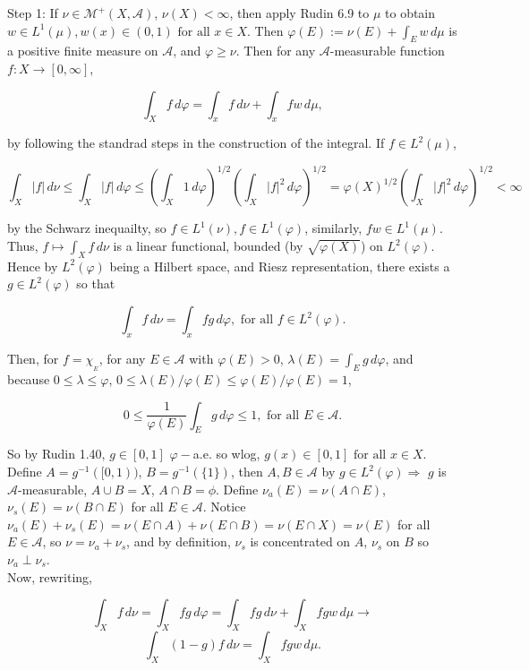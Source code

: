 \documentclass[12pt]{article}
\newcommand{\fall}[0] { \textrm{ for all } }
\newcommand{\rimply}[0] { \Rightarrow }
\newcommand{\rarw}[0] { \rightarrow }
\newcommand{\A}[0] { \mathcal{A} }
\newcommand{\M}[0] { \mathcal{M} }
\begin{document}
\noindent
Step 1: If $\nu \in \M^+(X, \A)$,  $\nu(X) < \infty$, then apply Rudin 6.9 to $\mu$ to obtain $w \in L^1(\mu), w(x) \in (0,1) \fall x \in X$. Then $\varphi(E) := \nu(E) + \int_E w \, d\mu$ is a positive finite measure on $\A$, and $\varphi \ge \nu$. Then for any $\A$-measurable function $f:X \rarw [0, \infty]$,

$$
\int_X f \, d\varphi = \int_x f \, d\nu + \int_x f w \, d\mu,
$$

\noindent
by following the standrad steps in the construction of the integral. If $f \in L^2(\mu)$,


$$
\int_X |f| \, d\nu  \le  \int_X |f| \, d\varphi \le \left( \int_X 1 \, d\varphi \right)^{1/2} \left( \int_X |f|^2 \, d\varphi \right)^{1/2}   = \varphi(X)^{1/2} \left( \int_X |f|^2 \, d\varphi \right)^{1/2} < \infty
$$

\noindent
by the Schwarz inequailty, so $f \in L^1(\nu), f \in L^1(\varphi)$, similarly, $fw \in L^1(\mu)$. Thus, $f \mapsto \int_X f \, d\nu$ is a linear functional, bounded (by $\sqrt{\varphi(X)}$)  on $L^2(\varphi)$. Hence by $L^2(\varphi)$ being a Hilbert space, and Riesz representation, there exists a $g \in L^2(\varphi)$ so that

$$
\int_x f \, d\nu = \int_x fg \, d\varphi, \fall f \in L^2(\varphi).
$$


\noindent
Then, for $f = \chi_{_E}$, for any $E \in \A$ with $\varphi(E) > 0$, $\lambda(E) = \int_E g \, d\varphi$, and because $ 0 \le \lambda \le \varphi$, $ 0 \le \lambda(E) / \varphi(E) \le \varphi(E)  / \varphi(E) = 1$,

$$
0 \le \frac{1}{\varphi(E)} \int_E g \, d\varphi \le 1, \fall E \in \A.
$$

\noindent
So by Rudin 1.40, $g \in [0,1]$ $\varphi-$a.e. so wlog, $g(x) \in [0,1] \fall x \in X$. \\

\noindent
Define $A = g^{-1} ([0,1))$, $B = g^{-1}( \{ 1 \})$, then $A,B \in \A$ by $g \in L^2(\varphi) \rimply$ $g$ is $\A$-measurable, $A \cup B = X$, $A \cap B = \phi$. Define $\nu_a(E) = \nu(A \cap E)$, $\nu_s(E) = \nu(B \cap E)$ for all $E \in \A$. Notice $\nu_a(E) + \nu_s(E) = \nu(E \cap A) + \nu(E \cap B) = \nu(E \cap X) = \nu(E)$ for all $E \in \A$, so $\nu = \nu_a +\nu_s$, and by definition, $\nu_s$ is concentrated on $A$, $\nu_s$ on $B$ so $\nu_a \perp \nu_s$. \\


\noindent
Now, rewriting,

$$
\int_X f \, d\nu = \int_X fg \, d\varphi =  \int_X  fg \, d\nu  +  \int_X  fgw \, d\mu \rarw 
$$
$$
 \int_X (1-g) f \, d\nu = \int_X fgw \, d\mu.
$$
\end{document}
